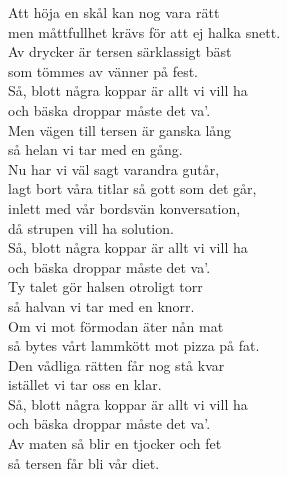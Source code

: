 \documentclass[a6paper, 10pt, twoside]{article}
\begin{document}
\noindent
\begin{center}
\end{center}
\begin{lyrics}
Att höja en skål kan nog vara rätt \\
men måttfullhet krävs för att ej halka snett. \\
Av drycker är tersen särklassigt bäst \\
som tömmes av vänner på fest. \\
Så, blott några koppar är allt vi vill ha \\
och bäska droppar måste det va'. \\
Men vägen till tersen är ganska lång \\
så helan vi tar med en gång. 
\vspace{5pt} \\
Nu har vi väl sagt varandra gutår, \\
lagt bort våra titlar så gott som det går, \\
inlett med vår bordsvän konversation, \\
då strupen vill ha solution. \\
Så, blott några koppar är allt vi vill ha \\
och bäska droppar måste det va'. \\
Ty talet gör halsen otroligt torr \\
så halvan vi tar med en knorr. 
\vspace{5pt} \\
Om vi mot förmodan äter nån mat \\
så bytes vårt lammkött mot pizza på fat. \\
Den vådliga rätten får nog stå kvar \\
istället vi tar oss en klar. \\
Så, blott några koppar är allt vi vill ha \\
och bäska droppar måste det va'. \\
Av maten så blir en tjocker och fet \\
så tersen får bli vår diet. 
\end{lyrics}
\end{document}
